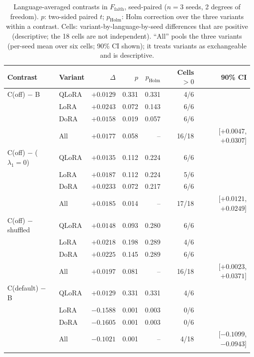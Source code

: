 \begin{table}[t]
\centering
\caption{Language-averaged contrasts in $F_{\text{faith}}$, seed-paired ($n=3$ seeds, 2 degrees of freedom). $p$: two-sided paired $t$; $p_{\text{Holm}}$: Holm correction over the three variants within a contrast. Cells: variant-by-language-by-seed differences that are positive (descriptive; the 18 cells are not independent). ``All'' pools the three variants (per-seed mean over six cells; 90\% CI shown); it treats variants as exchangeable and is descriptive.}
\label{tab:contrasts}
\footnotesize
\begin{tabular}{@{}llrrrrr@{}}
\toprule
\textbf{Contrast} & \textbf{Variant} & $\Delta$ & $p$ & $p_{\text{Holm}}$ & Cells $>0$ & 90\% CI \\
\midrule
C(off) $-$ B & QLoRA & $+0.0129$ & 0.331 & 0.331 & 4/6 & \\
 & LoRA & $+0.0243$ & 0.072 & 0.143 & 6/6 & \\
 & DoRA & $+0.0158$ & 0.019 & 0.057 & 6/6 & \\
 & All & $+0.0177$ & 0.058 & -- & 16/18 & [$+0.0047$, $+0.0307$] \\
\midrule
C(off) $-$ ($\lambda_1{=}0$) & QLoRA & $+0.0135$ & 0.112 & 0.224 & 6/6 & \\
 & LoRA & $+0.0187$ & 0.112 & 0.224 & 5/6 & \\
 & DoRA & $+0.0233$ & 0.072 & 0.217 & 6/6 & \\
 & All & $+0.0185$ & 0.014 & -- & 17/18 & [$+0.0121$, $+0.0249$] \\
\midrule
C(off) $-$ shuffled & QLoRA & $+0.0148$ & 0.093 & 0.280 & 6/6 & \\
 & LoRA & $+0.0218$ & 0.198 & 0.289 & 4/6 & \\
 & DoRA & $+0.0225$ & 0.145 & 0.289 & 6/6 & \\
 & All & $+0.0197$ & 0.081 & -- & 16/18 & [$+0.0023$, $+0.0371$] \\
\midrule
C(default) $-$ B & QLoRA & $+0.0129$ & 0.331 & 0.331 & 4/6 & \\
 & LoRA & $-0.1588$ & 0.001 & 0.003 & 0/6 & \\
 & DoRA & $-0.1605$ & 0.001 & 0.003 & 0/6 & \\
 & All & $-0.1021$ & 0.001 & -- & 4/18 & [$-0.1099$, $-0.0943$] \\
\botrule
\end{tabular}
\end{table}